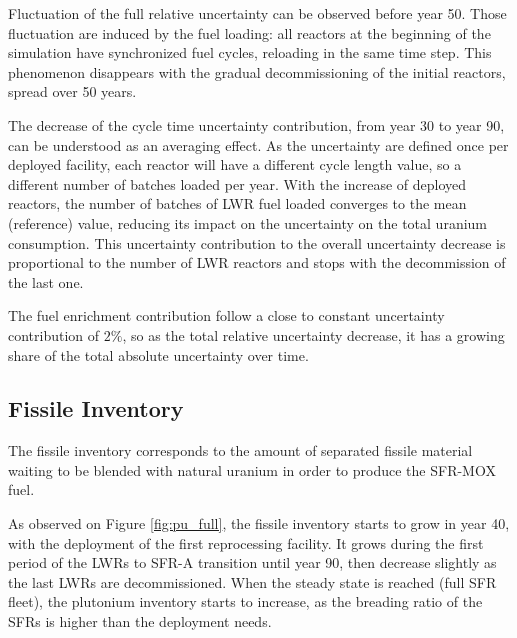 \documentclass{anstrans}
\begin{document}
Fluctuation of the full relative uncertainty can be observed before year 50.
Those fluctuation are induced by the fuel loading: all reactors at the beginning
of the simulation have synchronized fuel cycles, reloading in the same time
step.  This phenomenon disappears with the gradual decommissioning of the
initial reactors, spread over 50 years.

The decrease of the cycle time uncertainty contribution, from year 30 to year
90, can be understood as an averaging effect.  As the uncertainty are defined
once per deployed facility, each reactor will have a different cycle length
value, so a different number of batches loaded per year.  With the increase of
deployed reactors, the number of batches of \gls{LWR} fuel loaded converges to
the mean (reference) value, reducing its impact on the uncertainty on the total
uranium consumption. This uncertainty contribution to the overall uncertainty
decrease is proportional to the number of \gls{LWR} reactors and stops with the
decommission of the last one.

The fuel enrichment contribution follow a close to constant uncertainty
contribution of $2\%$, so as the total relative uncertainty decrease, it
has a growing share of the total absolute uncertainty over time.

\subsection{Fissile Inventory}

The fissile inventory corresponds to the amount of separated fissile material
waiting to be blended with natural uranium in order to produce the
\gls{SFR}-\gls{MOX} fuel.

As observed on Figure \ref{fig:pu_full}, the fissile inventory starts to grow in
year 40, with the deployment of the first reprocessing facility.  It grows
during the first period of the \glspl{LWR} to \gls{SFR}-A transition until year
90, then decrease slightly as the last \glspl{LWR} are decommissioned.  When the
steady state is reached (full \gls{SFR} fleet), the plutonium inventory starts
to increase, as the breading ratio of the \glspl{SFR} is higher than the
deployment needs.
\end{document}
